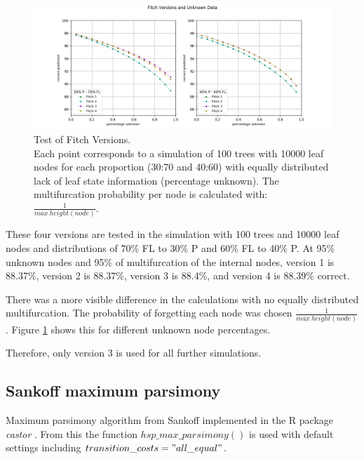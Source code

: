       \begin{figure}[h!]
        \centering
        \includegraphics[trim = 24mm 0mm 28mm 14mm, clip, width=\textwidth]{Figures/simulation_fitch_evaluation.png}
        \caption{Test of Fitch Versions. \\
          Each point corresponds to a simulation of 100 trees with 10000 leaf nodes for each proportion 
            (30:70 and 40:60) with equally distributed lack of leaf state information (percentage 
            unknown). The multifurcation probability per node is calculated with: 
            $\frac{1}{max~height(node)}$.}
        \label{fig:Fitch versions}
      \end{figure}
      These four versions are tested in the simulation with 100 trees and 10000 leaf nodes and 
        distributions of 70\% FL to 30\% P and 60\% FL to 40\% P. At 95\% unknown nodes and 95\% of 
        multifurcation of the internal nodes, version 1 is 88.37\%, version 2 is 88.37\%, version 3 is 
        88.4\%, and version 4 is 88.39\% correct.

      There was a more visible difference in the calculations with no equally distributed multifurcation. 
        The probability of forgetting each node was chosen $\frac{1}{max~height(node)}$. Figure 
        \ref{fig:Fitch versions} shows this for different unknown node percentages.

      Therefore, only version 3 is used for all further simulations.

    \subsection{Sankoff maximum parsimony}
      Maximum parsimony algorithm from Sankoff implemented in the R package \textit{castor} \cite{Louca2017}.
        From this the function \textit{$hsp\_max\_parsimony()$} is used with default settings including
        $transition\_costs="all\_equal"$. \\

